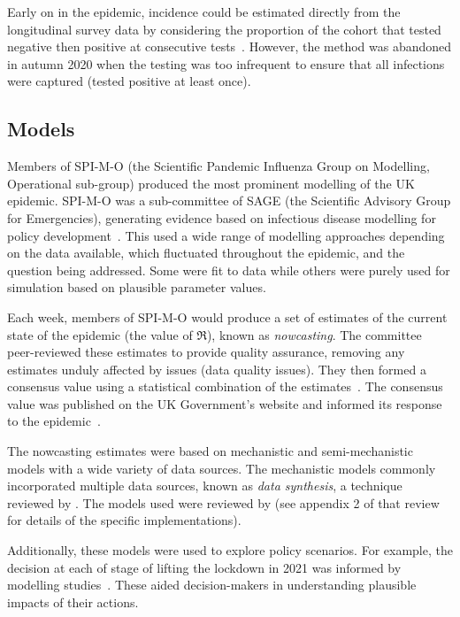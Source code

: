 \documentclass[thesis.tex]{subfiles}
\begin{document}
Early on in the epidemic, incidence could be estimated directly from the longitudinal survey data by considering the proportion of the cohort that tested negative then positive at consecutive tests~\autocite{onsIncidenceOld}.
However, the method was abandoned in autumn 2020 when the testing was too infrequent to ensure that all infections were captured (\ie tested positive at least once).

\subsection{Models}

Members of SPI-M-O (the Scientific Pandemic Influenza Group on Modelling, Operational sub-group) produced the most prominent modelling of the UK epidemic.
SPI-M-O was a sub-committee of SAGE (the Scientific Advisory Group for Emergencies), generating evidence based on infectious disease modelling for policy development~\autocite{medleySPIM,govSPIMO}.
This used a wide range of  modelling approaches depending on the data available, which fluctuated throughout the epidemic, and the question being addressed.
Some were fit to data while others were purely used for simulation based on plausible parameter values.

Each week, members of SPI-M-O would produce a set of estimates of the current state of the epidemic (\eg the value of $\Re$), known as \emph{nowcasting}.
The committee peer-reviewed these estimates to provide quality assurance, removing any estimates unduly affected by issues (\eg data quality issues).
They then formed a consensus value using a statistical combination of the estimates~\autocite{parkCombining}.
The consensus value was published on the UK Government's website and informed its response to the epidemic~\autocite{govRnumber}.

The nowcasting estimates were based on mechanistic and semi-mechanistic models with a wide variety of data sources.
The mechanistic models commonly incorporated multiple data sources, known as \emph{data synthesis}, a technique reviewed by \textcite{birrellEvidence}.
The models used were reviewed by \textcite{royalSocietyRnumber} (see appendix 2 of that review for details of the specific implementations).

Additionally, these models were used to explore policy scenarios.
For example, the decision at each of stage of lifting the lockdown in 2021 was informed by modelling studies~\autocite{sageEvidence}.
These aided decision-makers in understanding plausible impacts of their actions.
\end{document}
